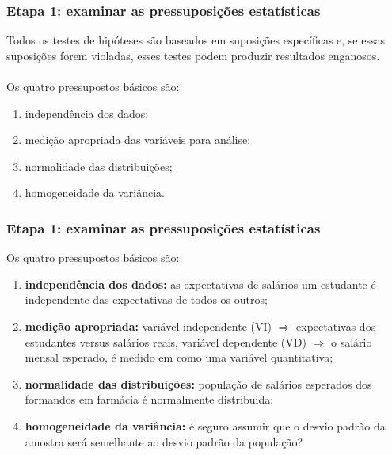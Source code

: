 \documentclass[11pt]{beamer}
\begin{document}
\begin{frame}
\frametitle{Etapa 1: examinar as pressuposições estatísticas}

Todos os testes de hipóteses são baseados em suposições específicas e, se essas suposições forem violadas, esses testes podem produzir resultados enganosos.\\~\\
Os quatro pressupostos básicos são:

\begin{enumerate}
\item independência dos dados;
\item medição apropriada das variáveis para análise;
\item normalidade das distribuições;
\item homogeneidade da variância.
\end{enumerate}

\end{frame}

\begin{frame}
\frametitle{Etapa 1: examinar as pressuposições estatísticas}

Os quatro pressupostos básicos são:

\begin{enumerate}
\item \textbf{independência dos dados:} as expectativas de salários um estudante é independente das expectativas de todos os outros;
\item \textbf{medição apropriada:} variável independente (VI) \(\Rightarrow\) expectativas dos estudantes versus salários reais, variável dependente (VD) \(\Rightarrow\) o salário mensal esperado, é medido em como uma variável quantitativa;
\item \textbf{normalidade das distribuições:} população de salários esperados dos formandos em farmácia é normalmente distribuida;
\item \textbf{homogeneidade da variância:} é seguro assumir que o desvio padrão da amostra será semelhante ao desvio padrão da população?
\end{enumerate}

\end{frame}
\end{document}
